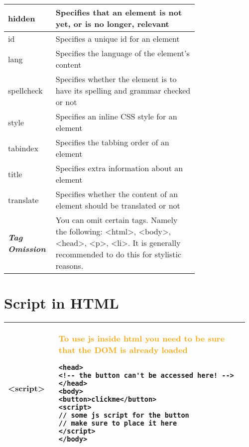 \documentclass[main.tex,fontsize=8pt,paper=a4,paper=portrait,DIV=calc,]{scrartcl}
\begin{document}
\begin{table}[h!]
\begin{tabular}{|p{0,2\linewidth}|p{0.755\linewidth}|}
\hline
hidden &	Specifies that an element is not yet, or is no longer, relevant\\
\hline
id & Specifies a unique id for an element\\
\hline
lang & Specifies the language of the element's content\\
\hline
spellcheck & Specifies whether the element is to have its spelling and grammar checked or not\\
\hline
style & Specifies an inline CSS style for an element\\
\hline
tabindex & Specifies the tabbing order of an element\\
\hline
title & Specifies extra information about an element\\
\hline
translate & Specifies whether the content of an element should be translated or not\\
\hline
\textbf{\emph{Tag Omission}} & You can omit certain tags. Namely the following: <html>, <body>, <head>, <p>, <li>.\newline
It is generally recommended to do this for stylistic reasons.\\
\hline
\end{tabular}
\section{Script in HTML}
\begin{tabular}{|m{0.2\linewidth}|m{0.755\linewidth}|}
\hline
<script> & 
\textcolor{orange}{To use js inside html you need to be sure that the DOM is already loaded}\newline
\begin{lstlisting}
<head>
<!-- the button can't be accessed here! -->
</head>
<body>
<button>clickme</button>
<script> 
// some js script for the button
// make sure to place it here
</script>
</body>
\end{lstlisting}\\
\hline
\end{tabular}
\end{table}
\end{document}
